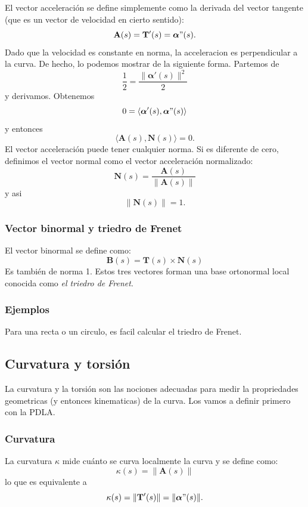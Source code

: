 \documentclass[11pt]{book}
\theoremstyle{definicion}
\theoremstyle{teorema}
\theoremstyle{ejemplo}
\begin{document}
\noindent
El vector acceleraci\'on se define simplemente como la derivada del vector tangente (que es un vector de velocidad en cierto sentido):
$$\mathbf{A}(s) = \mathbf{T}'(s) = \boldsymbol{\alpha}"(s).$$ Dado que la velocidad es constante en norma, la acceleracion es perpendicular a la curva. De hecho, lo podemos mostrar de la siguiente forma. 
%
Partemos de
$$\frac{1}{2}=\frac{\| \boldsymbol{\alpha}'(s) \|^2}{2}$$ y derivamos. Obtenemos
\[
0 = \langle \boldsymbol{\alpha}'(s) , \boldsymbol{\alpha}" (s) \rangle
\]
y entonces
\[
\langle \mathbf{A}(s) , \mathbf{N}(s) \rangle = 0.
\]
El vector acceleraci\'on puede tener cualquier norma.
Si es diferente de cero, definimos el vector normal como el vector acceleraci\'on normalizado:
\[
\mathbf{N}(s) = \frac{\mathbf{A}(s)}{\| \mathbf{A}(s) \|}
\]
y asi
\[
\| \mathbf{N}(s) \| = 1.
\]

\subsubsection{Vector binormal y triedro de Frenet}

\noindent
El vector binormal se define como:
\[ \mathbf{B}(s) = \mathbf{T}(s) \times \mathbf{N}(s) \]
%
Es tambi\'en de norma 1.
Estos tres vectores forman una base ortonormal local conocida como \emph{el triedro de Frenet}.

\subsubsection{Ejemplos}

\noindent Para una recta o un circulo, es facil calcular el triedro de Frenet.

\subsection{Curvatura y torsión}

\noindent La curvatura y la torsi\'on son las nociones adecuadas para medir la propriedades geometricas (y entonces kinematicas) de la curva. Los vamos a definir primero con la PDLA.

\subsubsection{Curvatura}

\noindent La curvatura \(\kappa\) mide cuánto se curva localmente la curva y se define como:
\[ \kappa(s) = \|\mathbf{A}(s)\| \]
lo que es equivalente a 
\[ \kappa(s) = \|\mathbf{T}'(s)\| 
= \|\boldsymbol{\alpha}"(s)\|. 
\]
%
\end{document}
